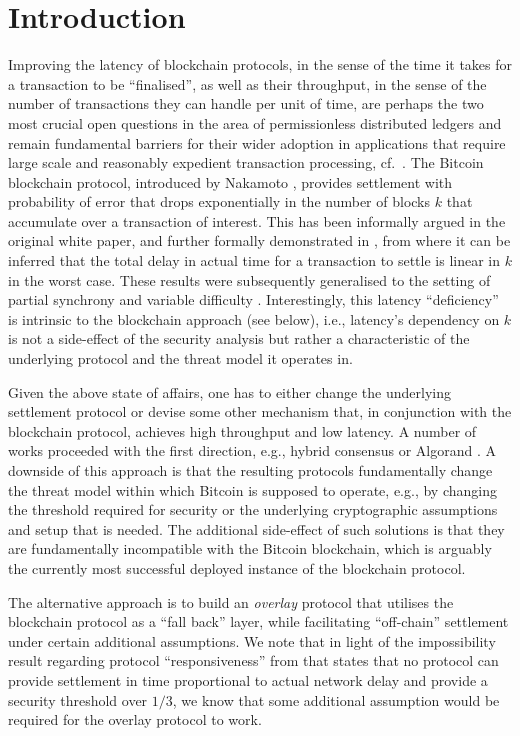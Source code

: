 
\section{Introduction}
\label{sec:intro}

Improving the latency of blockchain protocols, in the sense of the time it takes
for a transaction to be ``finalised'', as well as their throughput, in the sense
of the number of transactions they can handle per unit of time, are perhaps the
two most crucial open questions in the area of permissionless distributed
ledgers and remain fundamental barriers for their wider adoption in applications
that require large scale and reasonably expedient transaction processing,
cf.~\cite{scaling}. The Bitcoin blockchain protocol, introduced by Nakamoto
\cite{bitcoin}, provides settlement with probability of error that drops
exponentially in the number of blocks $k$ that accumulate over a transaction of
interest. This has been informally argued in the original white paper, and
further formally demonstrated in \cite{gkl}, from where it can be inferred that
the total delay in actual time for a transaction to settle is linear in $k$ in
the worst case. These results were subsequently generalised to the setting of
partial synchrony \cite{PSS16} and variable difficulty
\cite{DBLP:conf/crypto/GarayKL17}. Interestingly, this latency ``deficiency'' is
intrinsic to the blockchain approach (see below), i.e., latency's dependency on
$k$ is not a side-effect of the security analysis but rather a characteristic of
the underlying protocol and the threat model it operates in.

Given the above state of affairs, one has to either change the underlying
settlement protocol or devise some other mechanism that, in conjunction with the
blockchain protocol, achieves high throughput and low latency. A number of works
proceeded with the first direction, e.g., hybrid consensus
\cite{DBLP:conf/wdag/PassS17} or Algorand \cite{DBLP:journals/corr/Micali16}. A
downside of this approach is that the resulting protocols fundamentally change
the threat model within which Bitcoin is supposed to operate, e.g., by changing
the threshold required for security or the underlying cryptographic assumptions
and setup that is needed. The additional side-effect of such solutions is that
they are fundamentally incompatible with the Bitcoin blockchain, which is
arguably the currently most successful deployed instance of the blockchain
protocol.

The alternative approach is to build an {\em overlay} protocol that utilises the
blockchain protocol as a ``fall back'' layer, while facilitating ``off-chain''
settlement under certain additional assumptions. We note that in light of the
impossibility result regarding protocol ``responsiveness'' from
\cite{DBLP:conf/wdag/PassS17} that states that no protocol can provide
settlement in time proportional to actual network delay and provide a security
threshold over $1/3$, we know that some additional assumption would be required
for the overlay protocol to work.

